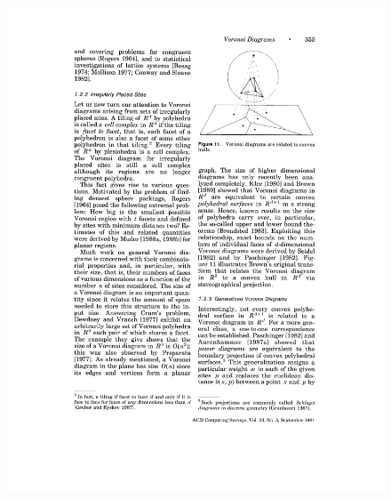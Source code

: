 \begin{figure}[htbp]
{	\includegraphics{grafics/voronoi_konvex_aus_aurenhammer.pdf}
	\label{fig:voronoi_konvex}
}
\end{figure}

\cite{Aurenhammer1991Voronoi}

\cite{Fortune1987, Dwyer1987} %
